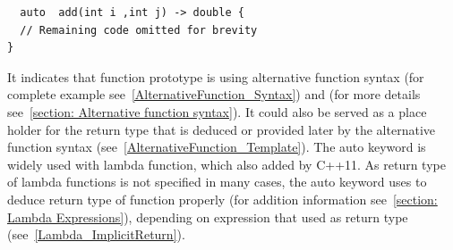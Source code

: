 \documentclass[11pt]{report}
\begin{document}
\begin{lstlisting}
  auto  add(int i ,int j) -> double {
  // Remaining code omitted for brevity
}
\end{lstlisting}
It indicates that function prototype is using alternative function syntax (for complete example see~\ref{AlternativeFunction_Syntax}) and (for more details see~\ref{section: Alternative function syntax}). It could also be served as a place holder for the return type that is deduced or provided later by the alternative function syntax (see~\ref{AlternativeFunction_Template}). The auto keyword is widely used with lambda function, which also added by C++11. As return type of lambda functions is not specified in many cases, the auto keyword uses to deduce return type of function properly (for addition information see~\ref{section: Lambda Expressions}), depending on expression that used as return type (see~\ref{Lambda_ImplicitReturn}).

\end{document}
